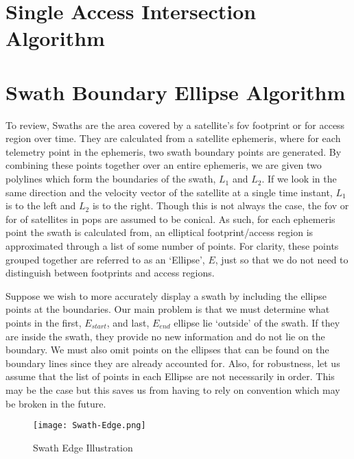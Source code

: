 
\section{Single Access Intersection Algorithm} \label{alg:contains}


\section{Swath Boundary Ellipse Algorithm} \label{alg:ellipse}

To review, Swaths are the area covered by a satellite's \gls{fov} footprint or
\gls{for} access region over time. They are calculated from a satellite
ephemeris, where for each telemetry point in the ephemeris, two swath boundary
points are generated. By combining these points together over an entire
ephemeris, we are given two polylines which form the boundaries of the swath,
$L_1$ and $L_2$. If we look in the same direction and the velocity vector of
the satellite at a single time instant, $L_1$ is to the left and $L_2$ is to
the right. Though this is not always the case, the \gls{fov} or \gls{for} of
satellites in \gls{pops} are assumed to be conical. As such, for each ephemeris
point the swath is calculated from, an elliptical footprint/access region is
approximated through a list of some number of points. For clarity, these points
grouped together are referred to as an `Ellipse', $E$, just so that we do not
need to distinguish between footprints and access regions.  

Suppose we wish to more accurately display a swath by including the ellipse
points at the boundaries. Our main problem is that we must determine what
points in the first, $E_{start}$, and last, $E_{end}$ ellipse lie `outside' of the
swath.  If they are inside the swath, they provide no new information and do
not lie on the boundary.  We must also omit points on the ellipses that can be
found on the boundary lines since they are already accounted for. Also, for
robustness, let us assume that the list of points in each Ellipse are not
necessarily in order. This may be the case but this saves us from having to
rely on convention which may be broken in the future.

\begin{figure}[h]
    \centering
    \texttt{[image: Swath-Edge.png]} 
    \caption{Swath Edge Illustration}
    \label{fig:swath-edge}
\end{figure}

